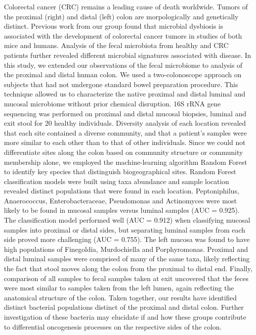 \documentclass[11pt,]{article}
\begin{document}
Colorectal cancer (CRC) remains a leading cause of death worldwide.
Tumors of the proximal (right) and distal (left) colon are
morpologically and genetically distinct. Previous work from our group
found that microbial dysbiosis is associated with the development of
colorectal cancer tumors in studies of both mice and humans. Analysis of
the fecal microbiota from healthy and CRC patients further revealed
different microbial signatures associated with disease. In this study,
we extended our observations of the fecal microbiome to analysis of the
proximal and distal human colon. We used a two-colonoscope approach on
subjects that had not undergone standard bowel preparation procedure.
This technique allowed us to characterize the native proximal and distal
luminal and mucosal microbiome without prior chemical disruption. 16S
rRNA gene sequencing was performed on proximal and distal mucosal
biopsies, luminal and exit stool for 20 healthy individuals. Diversity
analysis of each location revealed that each site contained a diverse
community, and that a patient's samples were more similar to each other
than to that of other individuals. Since we could not differentiate
sites along the colon based on community structure or community
membership alone, we employed the machine-learning algorithm Random
Forest to identify key species that distinguish biogeographical sites.
Random Forest classification models were built using taxa abundance and
sample location revealed distinct populations that were found in each
location. Peptoniphilus, Anaerococcus, Enterobacteraceae, Pseudomonas
and Actinomyces were most likely to be found in mucosal samples versus
luminal samples (AUC = 0.925). The classification model performed well
(AUC = 0.912) when classifying mucosal samples into proximal or distal
sides, but separating luminal samples from each side proved more
challenging (AUC = 0.755). The left mucosa was found to have high
populations of Finegoldia, Murdochiella and Porphyromonas. Proximal and
distal luminal samples were comprised of many of the same taxa, likely
reflecting the fact that stool moves along the colon from the proximal
to distal end. Finally, comparison of all samples to fecal samples taken
at exit uncovered that the feces were most similar to samples taken from
the left lumen, again reflecting the anatomical structure of the colon.
Taken together, our results have identified distinct bacterial
populations distinct of the proximal and distal colon. Further
investigation of these bacteria may elucidate if and how these groups
contribute to differential oncogenesis processes on the respective sides
of the colon.
\end{document}
